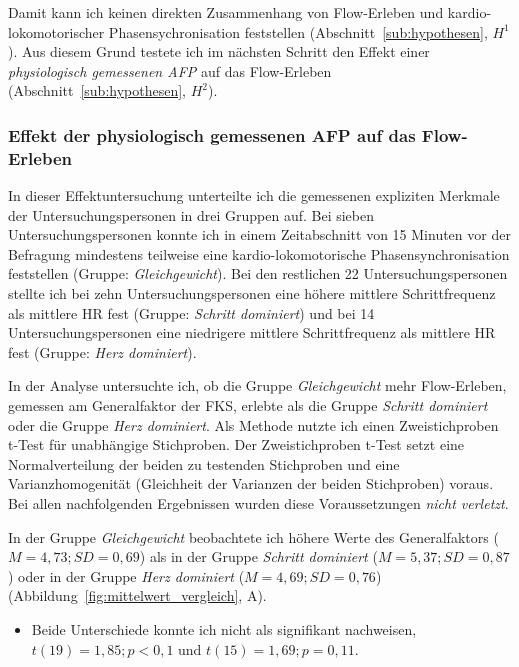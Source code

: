 Damit kann ich keinen direkten Zusammenhang von Flow-Erleben und kardio-lokomotorischer Phasensychronisation feststellen (Abschnitt~\ref{sub:hypothesen}, $H^1$). Aus diesem Grund testete ich im nächsten Schritt den Effekt einer \emph{physiologisch gemessenen \ac{AFP}} auf das Flow-Erleben (Abschnitt~\ref{sub:hypothesen}, $H^2$).

\subsubsection{Effekt der physiologisch gemessenen \ac{AFP} auf das Flow-Erleben} 

\label{ssub:effekt_der_physiologisch_gemessenen_afp}

In dieser Effektuntersuchung unterteilte ich die gemessenen expliziten Merkmale der Untersuchungspersonen in drei Gruppen auf. Bei sieben Untersuchungspersonen konnte ich in einem Zeitabschnitt von 15 Minuten vor der Befragung mindestens teilweise eine kardio-lokomotorische Phasensynchronisation feststellen (Gruppe: \emph{Gleichgewicht}). Bei den restlichen 22 Untersuchungspersonen stellte ich bei zehn Untersuchungspersonen eine höhere mittlere Schrittfrequenz als mittlere \ac{HR} fest (Gruppe: \emph{Schritt dominiert}) und bei 14 Untersuchungspersonen eine niedrigere mittlere Schrittfrequenz als mittlere \ac{HR} fest (Gruppe: \emph{Herz dominiert}).

In der Analyse untersuchte ich, ob die Gruppe \emph{Gleichgewicht} mehr Flow-Erleben, gemessen am Generalfaktor der \ac{FKS}, erlebte als die Gruppe \emph{Schritt dominiert} oder die Gruppe \emph{Herz dominiert}. Als Methode nutzte ich einen Zweistichproben t-Test für unabhängige Stichproben. Der Zweistichproben t-Test setzt eine Normalverteilung der beiden zu testenden Stichproben und eine Varianzhomogenität (Gleichheit der Varianzen der beiden Stichproben) voraus. Bei allen nachfolgenden Ergebnissen wurden diese Voraussetzungen \emph{nicht verletzt}. 

In der Gruppe \emph{Gleichgewicht} beobachtete ich höhere Werte des Generalfaktors ($M = 4{,}73; SD = 0{,}69$) als in der Gruppe \emph{Schritt dominiert} ($M = 5{,}37; SD = 0{,}87$) oder in der Gruppe \emph{Herz dominiert} ($M = 4{,}69; SD = 0{,}76$) (Abbildung~\ref{fig:mittelwert_vergleich}, A). 
\begin{itemize}
	
	\item Beide Unterschiede konnte ich nicht als signifikant nachweisen, $t(19) = 1{,}85; p < 0{,}1$ und $t(15) = 1{,}69; p = 0{,}11$.
\end{itemize}

